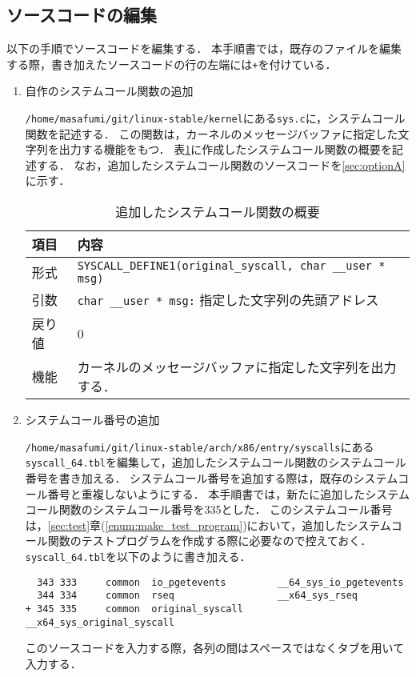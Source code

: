 \documentclass[12pt]{jsarticle}
\begin{document}
\subsection{ソースコードの編集}\label{subsec:edit_sourcecode}
以下の手順でソースコードを編集する．
本手順書では，既存のファイルを編集する際，書き加えたソースコードの行の左端には\verb|+|を付けている．
\begin{enumerate}
  \item 自作のシステムコール関数の追加

\verb|/home/masafumi/git/linux-stable/kernel|にある\verb|sys.c|に，システムコール関数を記述する．
この関数は，カーネルのメッセージバッファに指定した文字列を出力する機能をもつ．
表\ref{tab:3}に作成したシステムコール関数の概要を記述する．
なお，追加したシステムコール関数のソースコードを\ref{sec:optionA}に示す．
\begin{table}[h]
  \begin{center}
    \caption{追加したシステムコール関数の概要}\label{tab:3}
    \begin{tabular}{l|l}
      \hline\hline
      \multicolumn{1}{l|}{項目} & \multicolumn{1}{l}{内容}\\
      \hline
      形式 & \verb|SYSCALL_DEFINE1(original_syscall, char __user * msg)|\\
      引数 & \verb|char __user * msg:| 指定した文字列の先頭アドレス\\
      戻り値 & 0\\
      機能 & カーネルのメッセージバッファに指定した文字列を出力する．\\
      \hline
    \end{tabular}
  \end{center}
\end{table}


\item\label{enum:add_syscall_number} システムコール番号の追加

  \verb|/home/masafumi/git/linux-stable/arch/x86/entry/syscalls|にある\verb|syscall_64.tbl|を編集して，追加したシステムコール関数のシステムコール番号を書き加える．
  システムコール番号を追加する際は，既存のシステムコール番号と重複しないようにする．
  本手順書では，新たに追加したシステムコール関数のシステムコール番号を335とした．
  このシステムコール番号は，\ref{sec:test}章(\ref{enum:make_test_program})において，追加したシステムコール関数のテストプログラムを作成する際に必要なので控えておく．
  \verb|syscall_64.tbl|を以下のように書き加える．
\begin{verbatim}
  343 333     common  io_pgetevents         __64_sys_io_pgetevents
  344 334     common  rseq                  __x64_sys_rseq
+ 345 335     common  original_syscall      __x64_sys_original_syscall
\end{verbatim}
このソースコードを入力する際，各列の間はスペースではなくタブを用いて入力する．


\end{enumerate}
\end{document}
